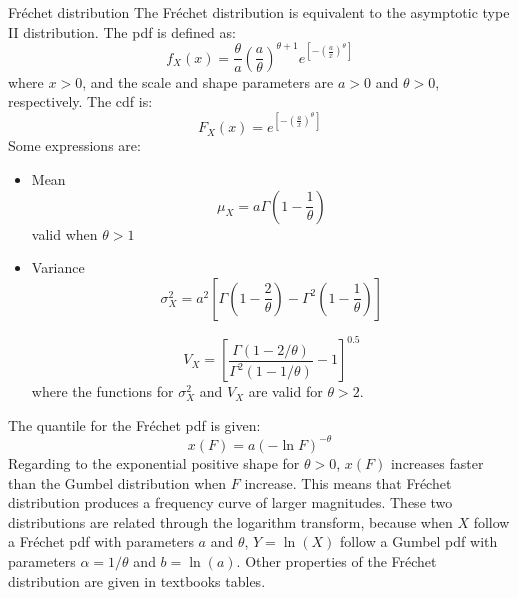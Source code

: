 \documentclass[8pt]{beamer}
\renewcommand{\emph}[1]{\textcolor{myorange}{#1}}
\begin{document}
\begin{frame}{Fr\'echet distribution}
    The \alert{Fr\'echet distribution} is equivalent to the asymptotic type II distribution. The \emph{pdf} is defined as:
                \vspace{-5pt}
    \[
        f_X (x) = \frac{\theta}{a} \left( \frac{a}{\theta} \right)^{\theta +1} e^{\left[ - \left(\frac{a}{x}\right)^{\theta} \right]}
    \]
    where $x>0$, and the scale and  shape parameters are  $a>0$ and $\theta >0$, respectively. The \emph{cdf} is:
    \[
        F_X (x) = e^{\left[ - \left( \frac{a}{x} \right)^{\theta} \right]}
        \]
    Some expressions are:
        \begin{itemize}
            \item \emph{Mean}
                \vspace{-5pt}
                \[
                    \mu_X = a \Gamma \left( 1 - \frac{1}{\theta} \right)
                \]
                valid when $\theta > 1$

            \item \emph{Variance}
                \vspace{-5pt}
                \[
                    \sigma_X^2 = a^2 \left[ \Gamma \left(1- \frac{2}{\theta} \right) - \Gamma^2 \left( 1- \frac{1}{\theta} \right) \right] 
                \]

                \[
                    V_X = \left[ \frac{\Gamma (1-2/\theta)}{\Gamma^2 (1-1/\theta)} -1\right]^{0.5} 
                \]
                where the functions for $\sigma_X^2$ and $V_X$  are valid for $\theta > 2$.         
        \end{itemize}
The quantile for the \emph{Fr\'echet pdf} is given:
                \[
                    x(F) = a (-\ln F )^{-\theta}
                \]
                Regarding  to the exponential positive shape for $\theta > 0$, $x(F)$ increases faster than the \emph{Gumbel distribution}  when $F$ increase. This means that \emph{Fr\'echet distribution} produces a frequency curve of larger magnitudes. These two distributions are related through the \emph{logarithm transform}, because when $X$ follow a \emph{Fr\'echet pdf} with parameters $a$ and $\theta$, $Y = \ln (X)$ follow a \emph{Gumbel pdf} with parameters $\alpha = 1/\theta$ and $b = \ln (a) $. Other properties of the \emph{Fr\'echet distribution} are given in textbooks tables. 

\end{frame}
\end{document}

